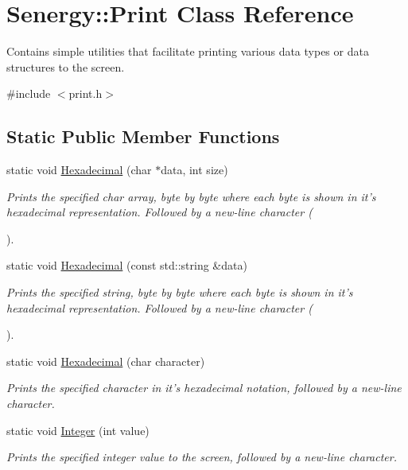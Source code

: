 \hypertarget{class_senergy_1_1_print}{\section{Senergy\-:\-:Print Class Reference}
\label{class_senergy_1_1_print}
}


Contains simple utilities that facilitate printing various data types or data structures to the screen.  




{\ttfamily \#include $<$print.\-h$>$}

\subsection*{Static Public Member Functions}
\begin{DoxyCompactItemize}
\item 
static void \hyperlink{class_senergy_1_1_print_a6c6b70bd91e56896058004bf82201010}{Hexadecimal} (char $\ast$data, int size)
\begin{DoxyCompactList}\small\item\em Prints the specified char array, byte by byte where each byte is shown in it's hexadecimal representation. Followed by a new-\/line character (\par
). \end{DoxyCompactList}\item 
static void \hyperlink{class_senergy_1_1_print_a28060c00de905d945667cf606f7ad1d6}{Hexadecimal} (const std\-::string \&data)
\begin{DoxyCompactList}\small\item\em Prints the specified string, byte by byte where each byte is shown in it's hexadecimal representation. Followed by a new-\/line character (\par
). \end{DoxyCompactList}\item 
static void \hyperlink{class_senergy_1_1_print_ac85fea5b673455bfc796d48c56fac38d}{Hexadecimal} (char character)
\begin{DoxyCompactList}\small\item\em Prints the specified character in it's hexadecimal notation, followed by a new-\/line character. \end{DoxyCompactList}\item 
static void \hyperlink{class_senergy_1_1_print_a7899dd50cdb0b0a6e7ed144d62ea227d}{Integer} (int value)
\begin{DoxyCompactList}\small\item\em Prints the specified integer value to the screen, followed by a new-\/line character. \end{DoxyCompactList}\end{DoxyCompactItemize}


